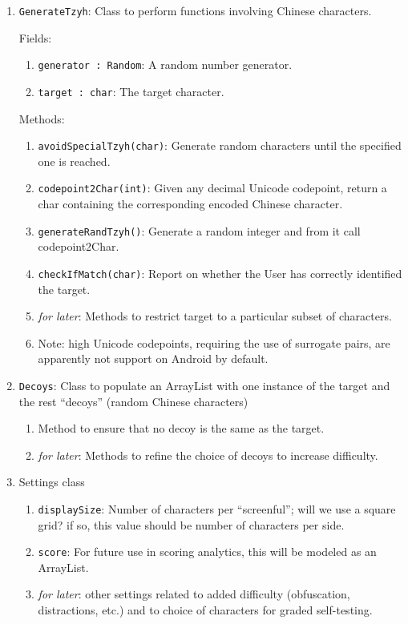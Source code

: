 \documentclass[11pt,asymmetric]{article}
\begin{document}
\begin{enumerate}
\item \texttt{GenerateTzyh}: Class to perform functions involving Chinese characters.

Fields:\begin{enumerate}
	\item \texttt{generator : Random}: A random number generator.
	\item \texttt{target : char}: The target character.
	\end{enumerate}

Methods:
	\begin{enumerate}
	\item \texttt{avoidSpecialTzyh(char)}: Generate random characters until the specified one is reached.
	\item \texttt{codepoint2Char(int)}: Given any decimal Unicode codepoint, return a char containing the corresponding encoded Chinese character.
	\item \texttt{generateRandTzyh()}: Generate a random integer and from it call codepoint2Char.
	\item \texttt{checkIfMatch(char)}: Report on whether the User has correctly identified the target.

	\item \textit{for later}: Methods to restrict target to a particular subset of characters.
	\item Note: high Unicode codepoints, requiring the use of surrogate pairs, are apparently not support on Android by default. 
	\end{enumerate}

\item \texttt{Decoys}: Class to populate an ArrayList with one instance of the target and the rest ``decoys'' (random Chinese characters)\begin{enumerate}
	\item Method to ensure that no decoy is the same as the target.
	\item \textit{for later}: Methods to refine the choice of decoys to increase difficulty.
	\end{enumerate}

\item Settings class\begin{enumerate}
	\item \texttt{displaySize}: Number of characters per ``screenful''; will we use a square grid? if so, this value should be number of characters per side.
	\item \texttt{score}: For future use in scoring analytics, this will be modeled as an ArrayList.
	\item \textit{for later}: other settings related to added difficulty (obfuscation, distractions, etc.) and to choice of characters for graded self-testing.
	\end{enumerate}


\end{enumerate}
\end{document}
